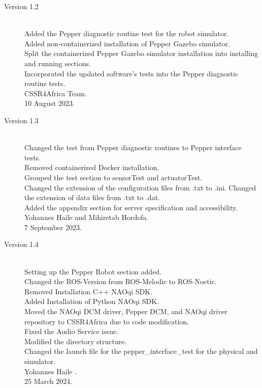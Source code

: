 \documentclass{CSSRforAfrica}
\begin{document}
{\begin{description}
			\item [Version 1.2]~\\
			Added the Pepper diagnostic routine test for the robot simulator.\\
			Added non-containerized installation of Pepper Gazebo simulator.\\
			Split the containerized Pepper Gazebo simulator installation into installing and running sections.\\
			Incorporated the updated software's tests into the Pepper diagnostic routine tests.\\
			CSSR4Africa Team.\\
			10 August 2023.
			
			\item [Version 1.3]~\\
			Changed the test from Pepper diagnostic routines to Pepper interface tests.\\
			Removed containerized Docker installation.\\
			Grouped the test section to sensorTest and actuatorTest.\\
			Changed the extension of the configuration files from .txt to .ini. Changed the extension of data files from .txt to .dat. \\
			Added the appendix section for server specification and accessibility.\\
			Yohannes Haile and Mihiretab Hordofa.\\
			7 September 2023.
			
			\item [Version 1.4]~\\
			Setting up the Pepper Robot section added.\\
			Changed the ROS-Version from ROS-Melodic to ROS-Noetic.\\
			Removed Installation C++ NAOqi SDK.\\
			Added Installation of Python NAOqi SDK.\\
			Moved the NAOqi DCM driver, Pepper DCM, and NAOqi driver repository to CSSR4Africa due to code modification.\\
			Fixed the Audio Service issue.\\
			Modified the directory structure.\\
			Changed the launch file for the pepper\_interface\_test for the physical and simulator.\\
			Yohannes Haile .\\
			25 March 2024.
			

\end{description}}
\end{document}
